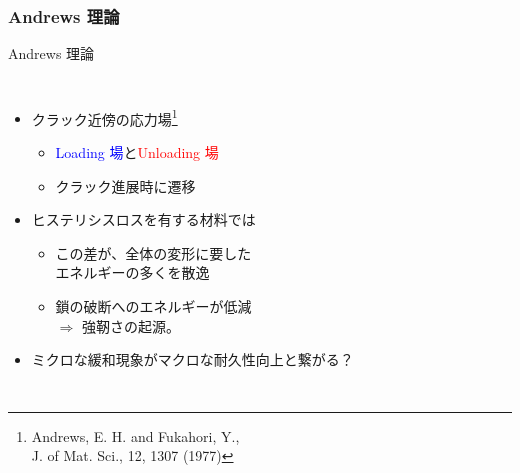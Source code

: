 \documentclass[12pt, dvipdfmx]{beamer}
\begin{document}
\begin{frame}
	\frametitle{Andrews 理論}
	\vspace{-2mm}
	\begin{exampleblock}{Andrews 理論}
		\begin{columns}[totalwidth=1\textwidth]
			\begin{itemize}
			\item クラック近傍の応力場\footnote{
					Andrews, E. H. and Fukahori, Y., \\J. of Mat. Sci., 12, 1307 (1977)
					}
					\begin{itemize}
						\item \textcolor{blue}{Loading 場}と\textcolor{red}{Unloading 場}
						\item クラック進展時に遷移
					\end{itemize}
			\item ヒステリシスロスを有する材料では
				\begin{itemize}
				\item
				\alert{この差}が、全体の変形に要した\\エネルギーの多くを\alert{散逸}
				\item
			鎖の破断へのエネルギーが低減 \\$\Rightarrow$ \alert{強靭さの起源。}
				\end{itemize}	
			\item \alert{ミクロな緩和現象}がマクロな耐久性向上と繋がる？
			\end{itemize}
		

\end{columns}
\end{exampleblock}
\end{frame}
\end{document}
